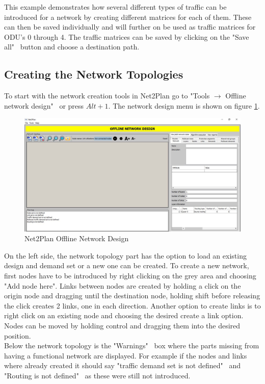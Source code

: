 	This example demonstrates how several different types of traffic can be introduced for a network by creating different matrices for each of them. These can then be saved individually and will further on be used as traffic matrices for ODU's 0 through 4. The traffic matrices can be saved by clicking on the "Save all" \ button and choose a destination path.
	
		
	\subsection*{Creating the Network Topologies} \label{Creating the Network topologies}
	To start with the network creation tools in Net2Plan go to "Tools $\rightarrow$ Offline network design" \ or press $Alt+1$. The network design menu is shown on figure \ref{Net2Plan_Network}.
	
	\begin{figure}[h!]
		\centering
		\includegraphics[width = 17cm]{Net2Plan_Network.pdf}
		\caption{Net2Plan Offline Network Design}
		\label{Net2Plan_Network}
	\end{figure}
	
	On the left side, the network topology part has the option to load an existing design and demand set or a new one can be created. To create a new network, first nodes have to be introduced by right clicking on the grey area and choosing "Add node here". Links between nodes are created by holding a click on the origin node and dragging until the destination node, holding shift before releasing the click creates 2 links, one in each direction. Another option to create links is to right click on an existing node and choosing the desired create a link option. Nodes can be moved by holding control and dragging them into the desired position.\\
	
	Below the network topology is the "Warnings" \ box where the parts missing from having a functional network are displayed. For example if the nodes and links where already created it should say "traffic demand set is not defined" \ and "Routing is not defined" \ as these were still not introduced.\\
	
